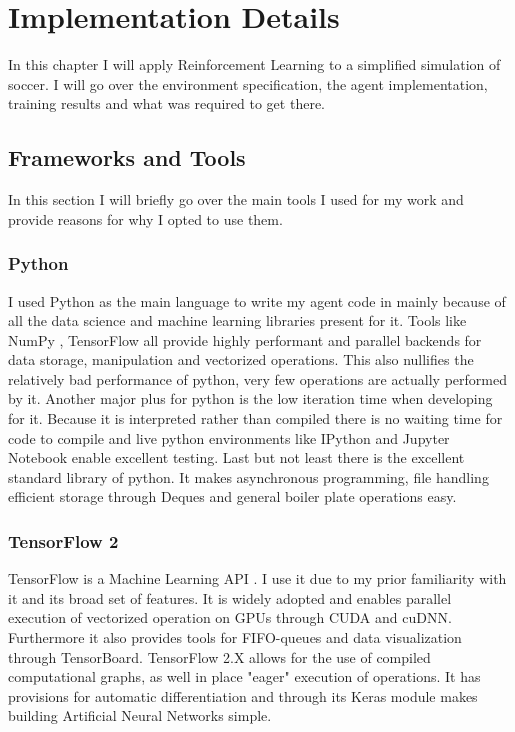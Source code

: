 \chapter{Implementation Details}\label{chap:in_practice}
In this chapter I will apply Reinforcement Learning to a simplified simulation of soccer. I will go over the environment specification, the agent implementation, training results and what was required to get there.

\section{Frameworks and Tools}\label{sec:ip:tools}
In this section I will briefly go over the main tools I used for my work and provide reasons for why I opted to use them.
\subsection{Python}\label{subsec:ip:tools:python}
I used Python as the main language to write my agent code in mainly because of all the data science and machine learning libraries present for it. Tools like NumPy \cite{noauthor_numpy_nodate}, TensorFlow all provide highly performant and parallel backends for data storage, manipulation and vectorized operations. This also nullifies the relatively bad performance of python, very few operations are actually performed by it.
\nolinebreak
Another major plus for python is the low iteration time when developing for it. Because it is interpreted rather than compiled there is no waiting time for code to compile and live python environments like IPython \cite{noauthor_ipython_nodate} and Jupyter Notebook \cite{noauthor_jupyter_nodate} enable excellent testing.
\nolinebreak
Last but not least there is the excellent standard library of python. It makes asynchronous programming, file handling efficient storage through Deques and general boiler plate operations easy.

\subsection{TensorFlow 2}\label{subsec:ip:tools:tensorflow}
TensorFlow is a Machine Learning API \cite{noauthor_tensorflow_nodate}. I use it due to my prior familiarity with it and its broad set of features. It is widely adopted and enables parallel execution of vectorized operation on GPUs through CUDA and cuDNN. Furthermore it also provides tools for FIFO-queues and data visualization through TensorBoard. TensorFlow 2.X allows for the use of compiled computational graphs, as well in place "eager" execution of operations. It has provisions for automatic differentiation and through its Keras \cite{chollet2015keras} module makes building Artificial Neural Networks simple.

